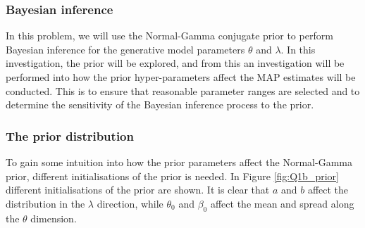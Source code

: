 \documentclass{article}
\begin{document}
\subsubsection{Bayesian inference}
In this problem, we will use the Normal-Gamma conjugate prior to perform Bayesian inference for the generative model parameters $\theta$ and $\lambda$. In this investigation, the prior will be explored, and from this an investigation will be performed into how the prior hyper-parameters affect the MAP estimates will be conducted. This is to ensure that reasonable parameter ranges are selected and to determine the sensitivity of the Bayesian inference process to the prior.

\subsubsection*{The prior distribution}
To gain some intuition into how the prior parameters affect the Normal-Gamma prior, different initialisations of the prior is needed. In Figure \ref{fig:Q1b_prior} different initialisations of the prior are shown. It is clear that $a$ and $b$ affect the distribution in the $\lambda$ direction, while $\theta_0$ and $\beta_0$ affect the mean and spread along the $\theta$ dimension.
\end{document}
